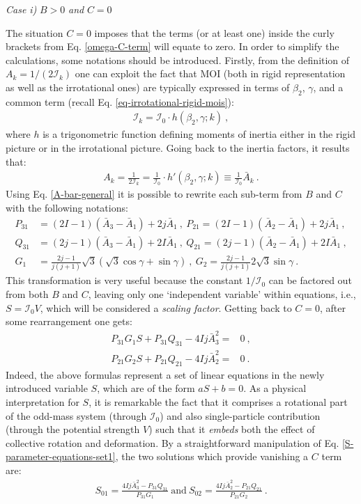 \textit{Case i)} $B>0$ \textit{and} $C=0$

The situation $C=0$ imposes that the terms (or at least one) inside the curly brackets from Eq. \ref{omega-C-term} will equate to zero. In order to simplify the calculations, some notations should be introduced. Firstly, from the definition of $A_k=1/(2\mathcal{I}_k)$ one can exploit the fact that MOI (both in rigid representation as well as the irrotational ones) are typically expressed in terms of $\beta_2$, $\gamma$, and a common term (recall Eq. \ref{eq-irrotational-rigid-mois}):
\begin{align}
    \mathcal{I}_k=\mathcal{I}_0\cdot h(\beta_2,\gamma;k)\ ,
\end{align}
where $h$ is a trigonometric function defining moments of inertia either in the rigid picture or in the irrotational picture. Going back to the inertia factors, it results that:
\begin{align}
    A_k=\frac{1}{2\mathcal{I}_k}=\frac{1}{\mathcal{I}_0}\cdot h'(\beta_2,\gamma;k)\equiv\frac{1}{\mathcal{I}_0}\bar{A}_k\ .
    \label{A-bar-general}
\end{align}
Using Eq. \ref{A-bar-general} it is possible to rewrite each sub-term from $B$ and $C$ with the following notations:
\begin{align}
    P_{31}&=(2I-1)(\bar{A}_3-\bar{A}_1)+2j\bar{A}_1\ ,\ P_{21}=(2I-1)(\bar{A}_2-\bar{A}_1)+2j\bar{A}_1\ , \nonumber\\
    Q_{31}&=(2j-1)(\bar{A}_3-\bar{A}_1)+2I\bar{A}_1\ ,\ Q_{21}=(2j-1)(\bar{A}_2-\bar{A}_1)+2I\bar{A}_1\ ,\nonumber\\
    G_1&=\frac{2j-1}{j(j+1)}\sqrt{3}\left(\sqrt{3}\cos\gamma+\sin\gamma\right)\ ,\ G_2=\frac{2j-1}{j(j+1)}2\sqrt{3}\sin\gamma\ .
    \label{P-Q-G1-G2-factors}
\end{align}
This transformation is very useful because the constant $1/\mathcal{I}_0$ can be factored out from both $B$ and $C$, leaving only one `independent variable' within equations, i.e., $S=\mathcal{I}_0V$, which will be considered a \emph{scaling factor}. Getting back to $C=0$, after some rearrangement one gets:
\begin{align}
    P_{31}G_1S+P_{31}Q_{31}-4Ij\bar{A}_3^2=&0\ ,\nonumber\\
    P_{21}G_2S+P_{21}Q_{21}-4Ij\bar{A}_2^2=&0\ .
    \label{S-parameter-equations-set1}
\end{align}
Indeed, the above formulas represent a set of linear equations in the newly introduced variable $S$, which are of the form $aS+b=0$. As a physical interpretation for $S$, it is remarkable the fact that it comprises a rotational part of the odd-mass system (through $\mathcal{I}_0$) and also single-particle contribution (through the potential strength $V$) such that it \emph{embeds} both the effect of collective rotation and deformation. By a straightforward manipulation of Eq. \ref{S-parameter-equations-set1}, the two solutions which provide vanishing a $C$ term are:
\begin{align}
    S_{01}=\frac{4Ij\bar{A}_3^2-P_{31}Q_{31}}{P_{31}G_1}\ \text{and}\ S_{02}=\frac{4Ij\bar{A}_2^2-P_{21}Q_{21}}{P_{21}G_2}\ .
    \label{C-Term-zero-solutions}
\end{align}

